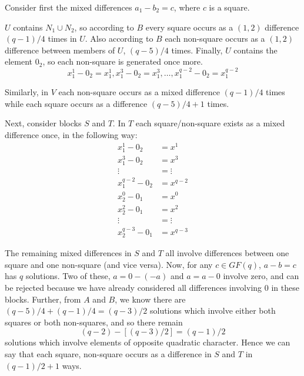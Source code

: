 \documentclass[
  11pt,
  a4paper]{book}
\begin{document}
Consider first the mixed differences \(a_1 - b_2 = c\), where \(c\) is a
square.

\(U\) contains \(N_1 \cup N_2\), so according to \(B\) every square
occurs as a \((1, 2)\) difference \((q - 1)/4\) times in \(U\). Also
according to \(B\) each non-square occurs as a \((1, 2)\) difference
between members of \(U\), \((q - 5)/4\) times. Finally, \(U\) contains
the element \(0_2\), so each non-square is generated once more.
\begin{equation}
x_1^1 - 0_2 = x^1_1, x_1^3 - 0_2 = x_1^3, \ldots, x_1^{q - 2} - 0_2 = x_1^{q - 2}
\end{equation}

Similarly, in \(V\) each non-square occurs as a mixed difference
\((q - 1)/4\) times while each square occurs as a difference
\((q - 5)/4 + 1\) times.

Next, consider blocks \(S\) and \(T\). In \(T\) each square/non-square
exists as a mixed difference once, in the following way: \begin{align*}
       x_1^1 - 0_2   &= x^1      \\
       x_1^3 - 0_2   &= x^3      \\
           \vdots    &= \vdots   \\             
   x^{q-2}_1 - 0_2   &= x^{q - 2}
\end{align*} \begin{align*}
       x_2^0 - 0_1   &= x^0      \\
       x_2^2 - 0_1   &= x^2      \\
    \vdots           &= \vdots   \\         
   x^{q-3}_2 - 0_1   &= x^{q-3}
\end{align*}

The remaining mixed differences in \(S\) and \(T\) all involve
differences between one square and one non-square (and vice versa). Now,
for any \(c \in GF(q)\), \(a - b = c\) has \(q\) solutions. Two of
these, \(a = 0 - (-a)\) and \(a = a - 0\) involve zero, and can be
rejected because we have already considered all differences involving 0
in these blocks. Further, from \(A\) and \(B\), we know there are
\((q - 5)/4 + (q - 1)/4 = (q - 3)/2\) solutions which involve either
both squares or both non-squares, and so there remain \begin{equation}
(q - 2) - [(q - 3)/2] = (q - 1)/2
\end{equation} solutions which involve elements of opposite quadratic
character. Hence we can say that each square, non-square occurs as a
difference in \(S\) and \(T\) in \((q - 1)/2 + 1\) ways.
\end{document}
